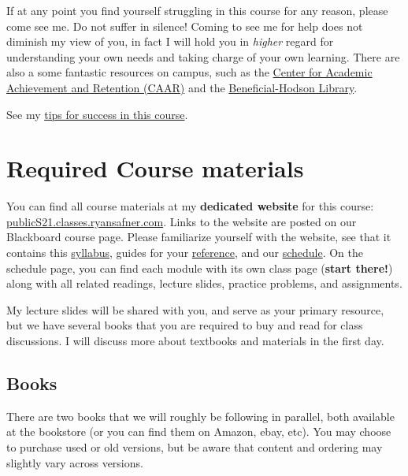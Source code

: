 \documentclass{article}
\begin{document}
If at any point you find yourself struggling in this course for any
reason, please come see me. Do not suffer in silence! Coming to see me
for help does not diminish my view of you, in fact I will hold you in
\emph{higher} regard for understanding your own needs and taking charge
of your own learning. There are also a some fantastic resources on
campus, such as the
\href{http://www.hood.edu/campus-services/academic-services/index.html}{Center
for Academic Achievement and Retention (CAAR)} and the
\href{http://www.hood.edu/library/}{Beneficial-Hodson Library}.

See my \href{/reference\#tips}{tips for success in this course}.

\hypertarget{required-course-materials}{%
\section{Required Course materials}\label{required-course-materials}}

You can find all course materials at my \textbf{dedicated website} for
this course:
\href{https://publicS21.classes.ryansafner.com}{publicS21.classes.ryansafner.com}.
Links to the website are posted on our Blackboard course page. Please
familiarize yourself with the website, see that it contains this
\href{https://publicS21.classes.ryansafner.com/syllabus/}{syllabus},
guides for your
\href{https://publicS21.classes.ryansafner.com/reference/}{reference},
and our
\href{https://publicS21.classes.ryansafner.com/schedule/}{schedule}. On
the schedule page, you can find each module with its own class page
(\textbf{start there!}) along with all related readings, lecture slides,
practice problems, and assignments.

My lecture slides will be shared with you, and serve as your primary
resource, but we have several books that you are required to buy and
read for class discussions. I will discuss more about textbooks and
materials in the first day.

\hypertarget{books}{%
\subsection{Books}\label{books}}

There are two books that we will roughly be following in parallel, both
available at the bookstore (or you can find them on Amazon, ebay, etc).
You may choose to purchase used or old versions, but be aware that
content and ordering may slightly vary across versions.
\end{document}
